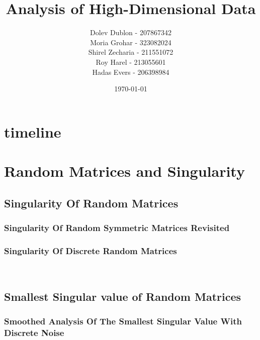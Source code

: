 \documentclass[12pt]{article}
\title{\textbf{Analysis of High-Dimensional Data}}
\author{
    Dolev Dublon - 207867342\\
    Moria Grohar - 323082024\\ 
    Shirel Zecharia - 211551072\\
    Roy Harel - 213055601\\
    Hadas Evers - 206398984 
}
\date{\today}
\begin{document}
\maketitle


\tableofcontents

\newpage





\section{timeline}



\section{Random Matrices and Singularity}





\subsection{Singularity Of Random Matrices}

\subsubsection{Singularity Of Random Symmetric Matrices Revisited}



\subsubsection{Singularity Of Discrete Random Matrices}

\\\newline


\subsection{Smallest Singular value of Random Matrices}



\subsubsection{Smoothed Analysis Of The Smallest Singular Value With Discrete Noise}
\end{document}
